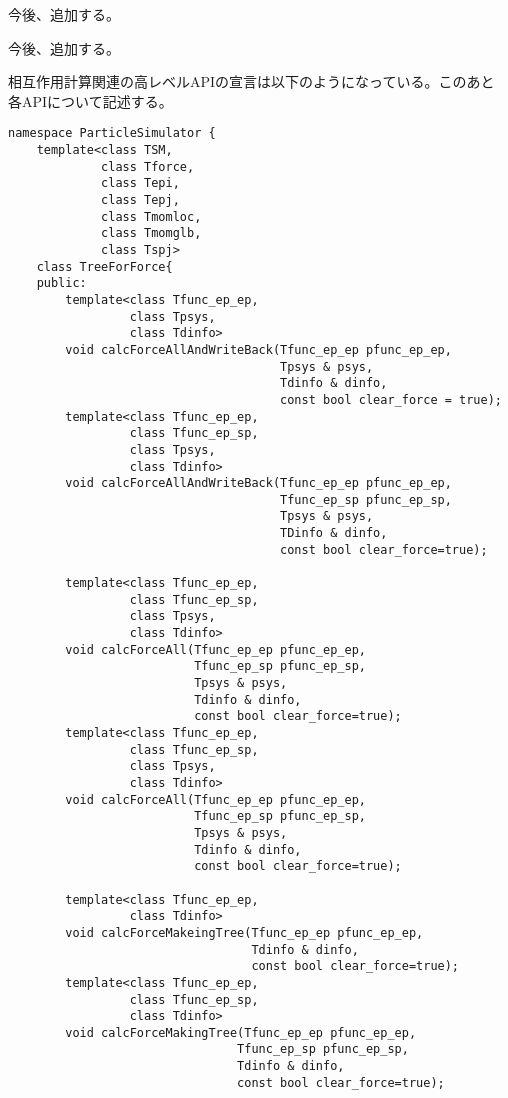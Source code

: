 
今後、追加する。


今後、追加する。


相互作用計算関連の高レベルAPIの宣言は以下のようになっている。このあと
各APIについて記述する。
\begin{lstlisting}[caption=TreeForForce1]
namespace ParticleSimulator {
    template<class TSM,
             class Tforce,
             class Tepi,
             class Tepj,
             class Tmomloc,
             class Tmomglb,
             class Tspj>
    class TreeForForce{
    public:
        template<class Tfunc_ep_ep,
                 class Tpsys,
                 class Tdinfo>
        void calcForceAllAndWriteBack(Tfunc_ep_ep pfunc_ep_ep,
                                      Tpsys & psys,
                                      Tdinfo & dinfo,
                                      const bool clear_force = true);
        template<class Tfunc_ep_ep,
                 class Tfunc_ep_sp,
                 class Tpsys,
                 class Tdinfo>
        void calcForceAllAndWriteBack(Tfunc_ep_ep pfunc_ep_ep, 
                                      Tfunc_ep_sp pfunc_ep_sp,  
                                      Tpsys & psys,
                                      TDinfo & dinfo,
                                      const bool clear_force=true);
                                      
        template<class Tfunc_ep_ep,
                 class Tfunc_ep_sp,
                 class Tpsys,
                 class Tdinfo>
        void calcForceAll(Tfunc_ep_ep pfunc_ep_ep,
                          Tfunc_ep_sp pfunc_ep_sp,
                          Tpsys & psys,
                          Tdinfo & dinfo,
                          const bool clear_force=true);
        template<class Tfunc_ep_ep,
                 class Tfunc_ep_sp,
                 class Tpsys,
                 class Tdinfo>
        void calcForceAll(Tfunc_ep_ep pfunc_ep_ep,
                          Tfunc_ep_sp pfunc_ep_sp,
                          Tpsys & psys,
                          Tdinfo & dinfo,
                          const bool clear_force=true);

        template<class Tfunc_ep_ep,
                 class Tdinfo>
        void calcForceMakeingTree(Tfunc_ep_ep pfunc_ep_ep,
                                  Tdinfo & dinfo,
                                  const bool clear_force=true);
        template<class Tfunc_ep_ep,
                 class Tfunc_ep_sp,
                 class Tdinfo>
        void calcForceMakingTree(Tfunc_ep_ep pfunc_ep_ep,
                                Tfunc_ep_sp pfunc_ep_sp,
                                Tdinfo & dinfo,
                                const bool clear_force=true);


\end{lstlisting}
